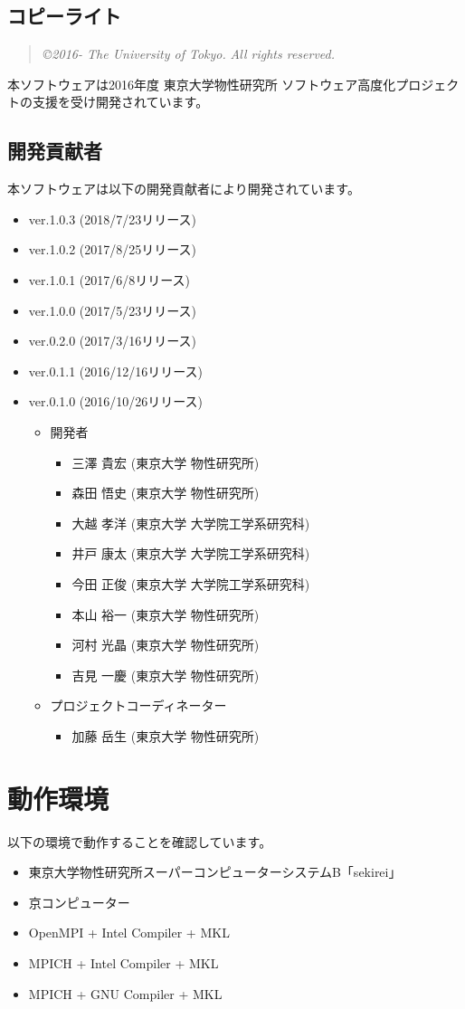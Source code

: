\subsection{コピーライト}
\begin{quote}
{\it \copyright  2016- The University of Tokyo.} {\it All rights reserved.}
\end{quote}
本ソフトウェアは2016年度 東京大学物性研究所 ソフトウェア高度化プロジェクトの支援を受け開発されています。

\subsection{開発貢献者}
\label{subsec:developers}
本ソフトウェアは以下の開発貢献者により開発されています。
\begin{itemize}
\item{ver.1.0.3 (2018/7/23リリース)}
\item{ver.1.0.2 (2017/8/25リリース)}
\item{ver.1.0.1 (2017/6/8リリース)}
\item{ver.1.0.0 (2017/5/23リリース)}
\item{ver.0.2.0 (2017/3/16リリース)}
\item{ver.0.1.1 (2016/12/16リリース)}
\item{ver.0.1.0 (2016/10/26リリース)}
\begin{itemize}
\item{開発者}
	\begin{itemize}
	\item{三澤 貴宏 (東京大学 物性研究所)}
	\item{森田 悟史 (東京大学 物性研究所)}
	\item{大越 孝洋 (東京大学 大学院工学系研究科)}
	\item{井戸 康太 (東京大学 大学院工学系研究科)}
	\item{今田 正俊 (東京大学 大学院工学系研究科)}
	\item{本山 裕一 (東京大学 物性研究所)}
	\item{河村 光晶 (東京大学 物性研究所)}
	\item{吉見 一慶 (東京大学 物性研究所)}
	\end{itemize}

\item{プロジェクトコーディネーター}
	\begin{itemize}
	\item{加藤 岳生 (東京大学 物性研究所)}
	\end{itemize}

\end{itemize}

\end{itemize}


\section{動作環境}
 以下の環境で動作することを確認しています。
\begin{itemize}
\item 東京大学物性研究所スーパーコンピューターシステムB「sekirei」
\item 京コンピューター
\item OpenMPI + Intel Compiler + MKL
\item MPICH + Intel Compiler + MKL
\item MPICH + GNU Compiler + MKL
\end{itemize}
